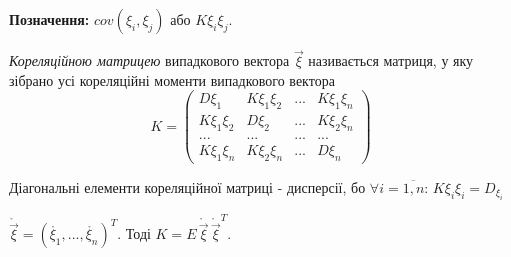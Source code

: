 \noindent \textbf{Позначення:} 
$cov(\xi_i,\xi_j)$ або 
$K\xi_i\xi_j$.

\begin{definition}
   \emph{Кореляційною матрицею} випадкового 
   вектора $\vec{\xi}$ називається матриця, у яку зібрано усі 
   кореляційні моменти випадкового вектора
   \begin{equation*}
       K = 
       \begin{pmatrix}
           D\xi_1 & K\xi_1\xi_2 & ... & K\xi_1\xi_n \\
           K\xi_1\xi_2 & D\xi_2 & ... & K\xi_2\xi_n \\
           ... & ... & ... & ...\\
           K\xi_1\xi_n & K\xi_2\xi_n & ... & D\xi_n
       \end{pmatrix}
   \end{equation*} 
\end{definition}
\begin{remark}[1]
    Діагональні елементи кореляційної матриці - дисперсії, бо 
    $\forall i = \overline{1,n} $: $K\xi_i\xi_i = D_{\xi_i}$
\end{remark}
\begin{remark}[2]
    $\mathring{\vec{\xi}} = \left(\mathring{\xi_1}, ..., \mathring{\xi_n}
    \right)^T$.
    Тоді $K = E\,\mathring{\vec{\xi}}\,\mathring{\vec{\xi}}^T$.
\end{remark}

